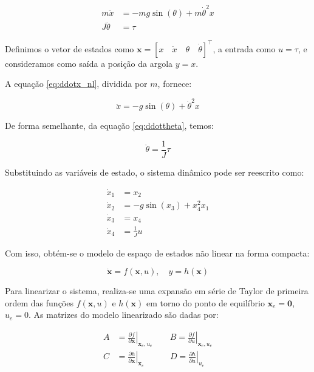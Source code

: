\documentclass[a4paper, 12pt]{article}
\begin{document}
\begin{align}
    m \ddot{x} &= -mg \sin(\theta) + m \dot{\theta}^2 x \label{eq:ddotx_nl} \\
    J \ddot{\theta} &= \tau \label{eq:ddottheta}
\end{align}

Definimos o vetor de estados como \( \mathbf{x} = [x \quad \dot{x} \quad \theta \quad \dot{\theta}]^\top \), a entrada como \( u = \tau \), e consideramos como saída a posição da argola \( y = x \).

A equação \eqref{eq:ddotx_nl}, dividida por \( m \), fornece:

\begin{equation}
    \ddot{x} = -g \sin(\theta) + \dot{\theta}^2 x
\end{equation}

De forma semelhante, da equação \eqref{eq:ddottheta}, temos:

\begin{equation}
    \ddot{\theta} = \frac{1}{J} \tau
\end{equation}

Substituindo as variáveis de estado, o sistema dinâmico pode ser reescrito como:

\begin{align}
    \dot{x}_1 &= x_2 \\
    \dot{x}_2 &= -g \sin(x_3) + x_4^2 x_1 \\
    \dot{x}_3 &= x_4 \\
    \dot{x}_4 &= \frac{1}{J} u
\end{align}

Com isso, obtém-se o modelo de espaço de estados não linear na forma compacta:

\begin{equation}
    \dot{\mathbf{x}} = f(\mathbf{x}, u), \quad y = h(\mathbf{x})
\end{equation}

Para linearizar o sistema, realiza-se uma expansão em série de Taylor de primeira ordem das funções \( f(\mathbf{x}, u) \) e \( h(\mathbf{x}) \) em torno do ponto de equilíbrio \( \mathbf{x}_e = \mathbf{0} \), \( u_e = 0 \). As matrizes do modelo linearizado são dadas por:

\begin{align}
    A &= \left.\frac{\partial f}{\partial \mathbf{x}}\right|_{\mathbf{x}_e, u_e} \qquad 
    B = \left.\frac{\partial f}{\partial u}\right|_{\mathbf{x}_e, u_e} \\
    C &= \left.\frac{\partial h}{\partial \mathbf{x}}\right|_{\mathbf{x}_e} \qquad\quad
    D = \left.\frac{\partial h}{\partial u}\right|_{u_e}
\end{align}
\end{document}
